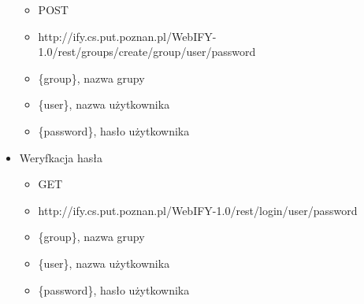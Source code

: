 \documentclass[11pt,a4paper,polish,thesis]{dcsbook}
\begin{document}
\begin{itemize}
\begin{itemize}
		\item POST
		\item http://ify.cs.put.poznan.pl/WebIFY-1.0/rest/groups/create/{group}/{user}/{password}
		\item \{group\}, nazwa grupy
		\item \{user\}, nazwa użytkownika
		\item \{password\},  hasło użytkownika 
	\end{itemize}
	\item Weryfkacja hasła
	\begin{itemize}
		\item GET
		\item http://ify.cs.put.poznan.pl/WebIFY-1.0/rest/login/{user}/{password}
		\item \{group\}, nazwa grupy
		\item \{user\}, nazwa użytkownika
		\item \{password\},  hasło użytkownika 
	\end{itemize}
\end{itemize}
\end{document}
